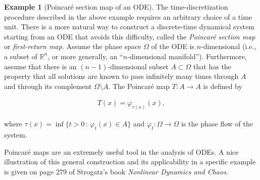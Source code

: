 \documentclass[11pt]{report}
\theoremstyle{plain}
\theoremstyle{definition}
\newtheorem{example}[thm]{Example}
\begin{document}
\begin{example}[Poincaré section map of an ODE]
The time-discretization procedure described in the
above example requires an arbitrary choice of a time
unit. There is a more natural way to construct a
discrete-time dynamical system starting from an ODE
that avoids this difficulty, called the \emph{Poincaré
section map} or \emph{first-return map}. Assume the phase
space $\Omega$ of the ODE is $n$-dimensional (i.e., a
subset of $\mathbb{R}^n$, or more generally, an
``$n$-dimensional manifold''). Furthermore, assume
that there is an $(n-1)$-dimensional subset
$A \subset \Omega$ that has the property that all
solutions are known to pass infinitely many times
through $A$ and through its complement
$\Omega\setminus A$. The Poincaré map $T:A\to A$ is
defined by

\begin{align*}
T(x) = \varphi_{\tau(x)}(x),
\end{align*}

\noindent where $\tau(x) = \inf\{ t>0\,:\, \varphi_t(x)\in A\}$
and $\varphi_t:\Omega\to\Omega$ is the phase flow of
the system.

Poincaré maps are an extremely useful tool in the
analysis of ODEs. A nice illustration of this general
construction and its applicability in a specific
example is given on page 279 of Strogatz's book
\emph{Nonlinear Dynamics and Chaos}.
\end{example}
\end{document}
